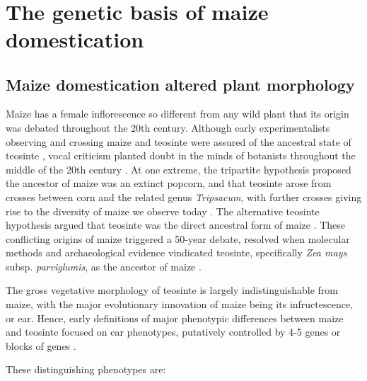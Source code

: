 \documentclass[9pt,twocolumn,twoside]{rilabRxiv}
\begin{document}
﻿\section*{The genetic basis of maize domestication}

\subsection*{Maize domestication altered plant morphology}

﻿Maize has a female inflorescence so different from any wild plant that its origin was debated throughout the 20th century.
Although early experimentalists observing and crossing maize and teosinte were assured of the ancestral state of teosinte \citep{harshberger1896, collins1920, weatherwax1924}, %
﻿vocal criticism planted doubt in the minds of botanists throughout the middle of the 20th century \citep{mangelsdorf1939, mangelsdorf1974}.
﻿At one extreme, the tripartite hypothesis proposed the ancestor of maize was an extinct popcorn, and that teosinte arose from crosses between corn and the related genus \textit{Tripsacum}, with further crosses giving rise to the diversity of maize we observe today \citep{mangelsdorf1939}.
﻿The alternative teosinte hypothesis argued that teosinte was the direct ancestral form of maize \citep{beadle1939}.
﻿These conflicting origins of maize triggered a 50-year debate, resolved when molecular methods and archaeological evidence vindicated teosinte, specifically \textit{Zea mays} subsp. \textit{parviglumis}, as the ancestor of maize \citep{matsuoka2002, piperno2009, bennetzen2001}.

﻿The gross vegetative morphology of teosinte is largely indistinguishable from maize, with the major evolutionary innovation of maize being its infructescence, or ear.
Hence, early definitions of major phenotypic differences between maize and teosinte focused on ear phenotypes, putatively controlled by 4-5 genes or blocks of genes \citep{beadle1939, mangelsdorf1939}.

\noindent These distinguishing phenotypes are:
\end{document}
